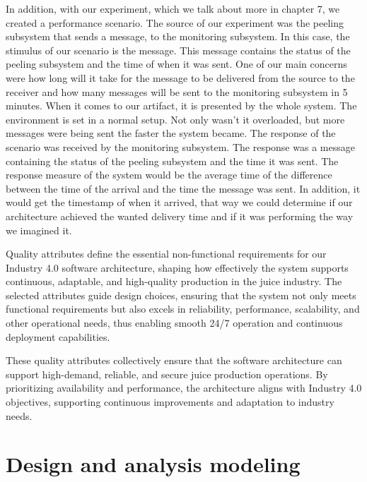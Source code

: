 \documentclass[conference]{IEEEtran}
\begin{document}
In addition, with our experiment, which we talk about more in chapter 7, we created a performance scenario. The source of our experiment was the peeling subsystem that sends a message, to the monitoring subsystem. In this case, the stimulus of our scenario is the message. This message contains the status of the peeling subsystem and the time of when it was sent. One of our main concerns were how long will it take for the message to be delivered from the source to the receiver and how many messages will be sent to the monitoring subsystem in 5 minutes. When it comes to our artifact, it is presented by the whole system. The environment is set in a normal setup. Not only wasn't it overloaded, but more messages were being sent the faster the system became. The response of the scenario was received by the monitoring subsystem. The response was a message containing the status of the peeling subsystem and the time it was sent. The response measure of the system would be the average time of the difference between the time of the arrival and the time the message was sent. In addition, it would get the timestamp of when it arrived, that way we could determine if our architecture achieved the wanted delivery time and if it was performing the way we imagined it. 

Quality attributes define the essential non-functional requirements for our Industry 4.0 software architecture, shaping how effectively the system supports continuous, adaptable, and high-quality production in the juice industry. The selected attributes guide design choices, ensuring that the system not only meets functional requirements but also excels in reliability, performance, scalability, and other operational needs, thus enabling smooth 24/7 operation and continuous deployment capabilities.

These quality attributes collectively ensure that the software architecture can support high-demand, reliable, and secure juice production operations. By prioritizing availability
and performance, the architecture aligns with Industry 4.0 objectives, supporting continuous improvements and adaptation to industry needs.

\section{Design and analysis modeling}
\end{document}
